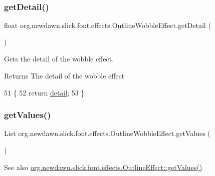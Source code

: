 \subsubsection{\texorpdfstring{get\+Detail()}{getDetail()}}
{\footnotesize\ttfamily float org.\+newdawn.\+slick.\+font.\+effects.\+Outline\+Wobble\+Effect.\+get\+Detail (\begin{DoxyParamCaption}{ }\end{DoxyParamCaption})\hspace{0.3cm}{\ttfamily [inline]}}

Gets the detail of the wobble effect.

\begin{DoxyReturn}{Returns}
The detail of the wobble effect 
\end{DoxyReturn}

\begin{DoxyCode}
51                              \{
52         \textcolor{keywordflow}{return} \mbox{\hyperlink{classorg_1_1newdawn_1_1slick_1_1font_1_1effects_1_1_outline_wobble_effect_ac43d2a2c878ac5034bf82a0837cfa86f}{detail}};
53     \}
\end{DoxyCode}
\mbox{\label{classorg_1_1newdawn_1_1slick_1_1font_1_1effects_1_1_outline_wobble_effect_a2276b90cf10a498d50044fb2c451e455}} 
\subsubsection{\texorpdfstring{get\+Values()}{getValues()}}
{\footnotesize\ttfamily List org.\+newdawn.\+slick.\+font.\+effects.\+Outline\+Wobble\+Effect.\+get\+Values (\begin{DoxyParamCaption}{ }\end{DoxyParamCaption})\hspace{0.3cm}{\ttfamily [inline]}}

\begin{DoxySeeAlso}{See also}
\mbox{\hyperlink{classorg_1_1newdawn_1_1slick_1_1font_1_1effects_1_1_outline_effect_adbf0ba0c8ddcdc2a53c6a4e8c583fa33}{org.\+newdawn.\+slick.\+font.\+effects.\+Outline\+Effect\+::get\+Values()}} 
\end{DoxySeeAlso}



